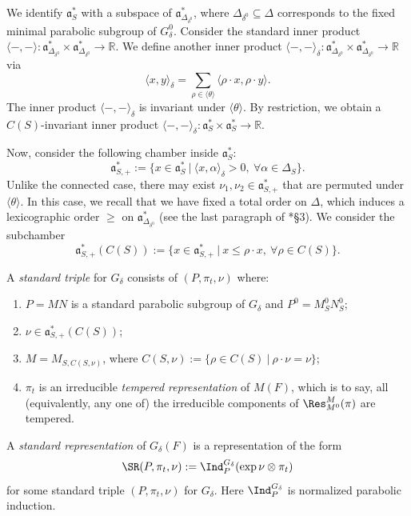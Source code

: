 \documentclass[11pt,letterpaper]{amsart}
\numberwithin{equation}{section}
\begin{document}
We identify $\mathfrak{a}_{S}^*$ with a subspace of $\mathfrak{a}_{\Delta_{\delta^0}}^*$, where $\Delta_{\delta^0} \subseteq \Delta$ corresponds to the fixed minimal parabolic subgroup of $G_\delta^0$.
Consider the standard inner product $\langle-,-\rangle:\mathfrak{a}_{\Delta_{\delta^0}}^*\times\mathfrak{a}_{\Delta_{\delta^0}}^*\rightarrow\mathbb{R}.$
We define another inner product $\langle-,-\rangle_\delta:\mathfrak{a}_{\Delta_{\delta^0}}^*\times\mathfrak{a}_{\Delta_{\delta^0}}^*\rightarrow\mathbb{R}$ via
\[
\langle x,y\rangle_\delta=\sum_{\rho\in \langle \theta\rangle}\langle \rho \cdot x, \rho \cdot y\rangle. 
\]
The inner product $\langle-,-\rangle_\delta$ is invariant under $\langle \theta\rangle$. By restriction, we obtain a $C({S})$-invariant inner product $\langle-,-\rangle_\delta:\mathfrak{a}_{S}^*\times \mathfrak{a}_{S}^*\rightarrow\mathbb{R}$. 

Now, consider the following chamber inside $ \mathfrak{a}_{{S}}^*$:
\[
\mathfrak{a}_{{S},+}^*:=\{x\in\mathfrak{a}_{S}^* \ | \ \langle x, \alpha\rangle_\delta>0,\ \forall \alpha \in \Delta_{S}\}.
\]
Unlike the connected case, there may exist $\nu_1, \nu_2 \in \mathfrak{a}_{{S},+}^*$ that are permuted under $\langle \theta\rangle$. 
In this case, we recall that we have fixed a total order on $\Delta$, which induces a lexicographic order $\geq$ on $ \mathfrak{a}_{\Delta_{\delta^0}}^{\ast}$ (see the last paragraph of \cite{BJ01}*{\S 3}). We consider the subchamber
\[
\mathfrak{a}_{{S},+}^*(C({S})):=\{x\in\mathfrak{a}_{{S},+}^* \ | \ x\leq\rho\cdot x, \ \forall \rho\in C({S})\}.
\]




\begin{definition}\label{definition: standard triple for representation}
A {\it standard triple} for $G_\delta$ consists of $(P,\pi_t,\nu)$ where:
    \begin{enumerate}
        \item[(0)] 
        $P=MN$ is a standard parabolic subgroup of $G_\delta$ and $P^0=M^0_{S} N_S^0$;
        \item[(1)] $\nu\in\mathfrak{a}_{{S},+}^*(C(S))$;
        \item[(2)]  $M=M_{{S},C({S},\nu)}$, where $C({S},\nu):=\{\rho\in C({S}) \ | \ \rho \cdot\nu=\nu\}$;
        \item[(3)]
        $\pi_t$ is an irreducible {\it tempered representation} of $M(F)$, which is to say, all (equivalently, any one of) the irreducible components of $\Res^{M}_{M^0}(\pi)$ are tempered.    \end{enumerate}
A {\it standard representation} of $G_\delta(F)$ is a representation of the form
\[
\SR(P,\pi_t,\nu):=\Ind_{P}^{G_\delta}(\exp\nu\otimes\pi_t)
\]
for some standard triple $(P,\pi_t,\nu)$ for $G_\delta$. Here $\Ind_{P}^{G_\delta}$ is normalized parabolic induction.
\end{definition}
\end{document}
